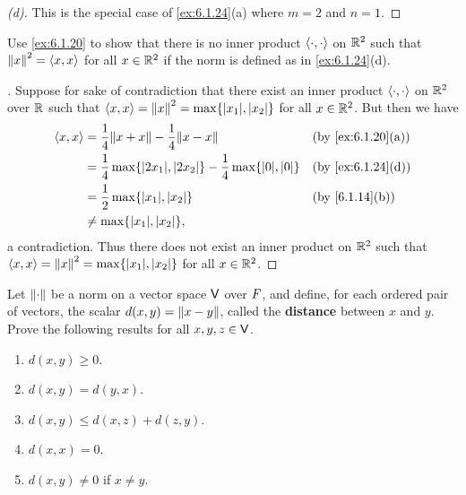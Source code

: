 \begin{proof}[(d)]
  This is the special case of \cref{ex:6.1.24}(a) where \(m = 2\) and \(n = 1\).
\end{proof}

\begin{ex}\label{ex:6.1.25}
  Use \cref{ex:6.1.20} to show that there is no inner product \(\left\langle\cdot, \cdot\right\rangle\) on \(\mathbb{R}^2\) such that \(\left\lVert x\right\rVert^2 = \left\langle x, x\right\rangle\) for all \(x \in \mathbb{R}^2\) if the norm is defined as in \cref{ex:6.1.24}(d).
\end{ex}

\begin{proof}[]
  Suppose for sake of contradiction that there exist an inner product \(\left\langle\cdot, \cdot\right\rangle\) on \(\mathbb{R}^2\) over \(\mathbb{R}\) such that \(\inn{x, x} = \norm{x}^2 = \max\set{\abs{x_1}, \abs{x_2}}\) for all \(x \in \mathbb{R}^2\).
  But then we have
  \begin{align*}
    \inn{x, x} & = \frac{1}{4} \norm{x + x} - \frac{1}{4} \norm{x - x}                                   &  & \text{(by \cref{ex:6.1.20}(a))} \\
               & = \frac{1}{4} \max\set{\abs{2x_1}, \abs{2x_2}} - \frac{1}{4} \max\set{\abs{0}, \abs{0}} &  & \text{(by \cref{ex:6.1.24}(d))} \\
               & = \frac{1}{2} \max\set{\abs{x_1}, \abs{x_2}}                                            &  & \text{(by \cref{6.1.14}(b))}    \\
               & \neq \max\set{\abs{x_1}, \abs{x_2}},
  \end{align*}
  a contradiction.
  Thus there does not exist an inner product on \(\mathbb{R}^2\) such that \(\inn{x, x} = \norm{x}^2 = \max\set{\abs{x_1}, \abs{x_2}}\) for all \(x \in \mathbb{R}^2\).
\end{proof}

\begin{ex}\label{ex:6.1.26}
  Let \(\left\lVert\cdot\right\rVert\) be a norm on a vector space \(\mathsf{V}\) over \(\mathit{F}\), and define, for each ordered pair of vectors, the scalar \(d(x, y) = \left\lVert x - y\right\rVert\), called the \textbf{distance} between \(x\) and \(y\).
  Prove the following results for all \(x, y, z \in \mathsf{V}\).
  \begin{enumerate}
    \item \(d(x, y) \geq 0\).
    \item \(d(x, y) = d(y, x)\).
    \item \(d(x, y) \leq d(x, z) + d(z, y)\).
    \item \(d(x, x) = 0\).
    \item \(d(x, y) \neq 0\) if \(x \neq y\).
  \end{enumerate}
\end{ex}

